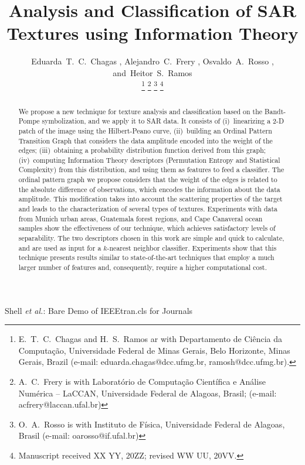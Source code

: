 \documentclass[journal]{IEEEtran}
\newcommand\orcidicon[1]{\href{https://orcid.org/#1}{\mbox{\scalerel*{
			\begin{tikzpicture}[yscale=-1,transform shape]
			\pic{orcidlogo};
			\end{tikzpicture}
		}{|}}}}
\begin{document}
\title{Analysis and Classification of SAR Textures using Information Theory}

\author{Eduarda~T.~C.~Chagas \orcidicon{0000-0001-9647-0506},
	Alejandro~C.~Frery \orcidicon{0000-0002-8002-5341},
	Osvaldo~A.~Rosso \orcidicon{0000-0002-1288-2528},
	and~Heitor~S.~Ramos \orcidicon{0000-0003-4523-6466}
	
	\thanks{E.\ T.\ C.\ Chagas and H.\ S.\ Ramos ar with Departamento de Ci\^encia da Computa\c c\~ao, Universidade Federal de Minas Gerais, Belo Horizonte, Minas Gerais, Brazil (e-mail: eduarda.chagas@dcc.ufmg.br, ramosh@dcc.ufmg.br).}
	\thanks{A.\ C.\ Frery is with Laborat\'orio de Computa\c c\~ao Cient\'ifica e An\'alise Num\'erica -- LaCCAN, Universidade Federal de Alagoas, Brasil; (e-mail: acfrery@laccan.ufal.br)}
	\thanks{O.\ A.\ Rosso is with Instituto de F\'isica, Universidade Federal de Alagoas, Brasil (e-mail: oarosso@if.ufal.br)}
	\thanks{Manuscript received XX YY, 20ZZ; revised WW UU, 20VV.}}


{Shell \MakeLowercase{\textit{et al.}}: Bare Demo of IEEEtran.cls for Journals}

\maketitle

\begin{abstract}
	We propose a new technique for texture analysis and classification based on the Bandt-Pompe symbolization, and we apply it to SAR data.
	It consists of
	(i)~linearizing a 2-D patch of the image using the Hilbert-Peano curve,
	(ii)~building an Ordinal Pattern Transition Graph that considers the data amplitude encoded into the weight of the edges;
	(iii)~obtaining a probability distribution function derived from this graph;
	(iv)~computing Information Theory descriptors (Permutation Entropy and Statistical Complexity) from this distribution, and using them as features to feed a classifier.
	The ordinal pattern graph we propose considers that the weight of the edges is related to the absolute difference of observations, which encodes the information about the data amplitude. 
	This modification takes into account the scattering properties of the target and leads to the characterization of several types of textures.
	Experiments with data from Munich urban areas, Guatemala forest regions, and Cape Canaveral ocean samples show the effectiveness of our technique, which achieves satisfactory levels of separability.
	The two descriptors chosen in this work are simple and quick to calculate, and are used as input for a $k$-nearest neighbor classifier.
	Experiments show that this technique presents results similar to state-of-the-art techniques that employ a much larger number of features and, consequently, require a higher computational cost.
\end{abstract}
\end{document}
